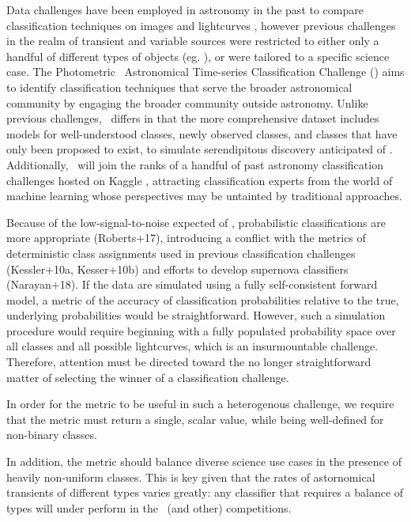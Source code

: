 Data challenges have been employed in astronomy in the past to compare classification techniques on images  and lightcurves , however previous challenges in the realm of transient and variable sources were restricted to either only a handful of different types of objects (eg. \snphotcc), or were tailored to a specific science case.
The Photometric \lsst\ Astronomical Time-series Classification Challenge (\plasticc) aims to identify classification techniques that serve the broader astronomical community by engaging the broader community outside astronomy.
Unlike previous challenges, \plasticc\ differs in that the more comprehensive dataset includes models for well-understood classes, newly observed classes, and classes that have only been proposed to exist, to simulate serendipitous discovery anticipated of \lsst.
Additionally, \plasticc\ will join the ranks of a handful of past astronomy classification challenges hosted on Kaggle , attracting classification experts from the world of machine learning whose perspectives may be untainted by traditional approaches.

Because of the low-signal-to-noise expected of \lsst, probabilistic classifications are more appropriate (Roberts+17), introducing a conflict with the metrics of deterministic class assignments used in previous classification challenges (Kessler+10a, Kesser+10b) and efforts to develop supernova classifiers (Narayan+18).
If the data are simulated using a fully self-consistent forward model, a metric of the accuracy of classification probabilities relative to the true, underlying probabilities would be straightforward.
However, such a simulation procedure would require beginning with a fully populated probability space over all classes and all possible lightcurves, which is an insurmountable challenge.
Therefore, attention must be directed toward the no longer straightforward matter of selecting the winner of a classification challenge.


In order for the metric to be useful in such a heterogenous challenge, we require that the metric must return a single, scalar value, while being well-defined for non-binary classes.

In addition, the metric should balance diverse science use cases in the presence of heavily non-uniform classes.
This is key given that the rates of astornomical transients of different types varies greatly: any classifier that requires a balance of types will under perform in the \plasticc\ (and other) competitions.


